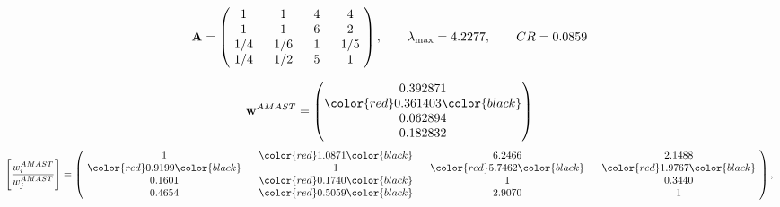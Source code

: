 \begin{example}
\begin{equation*}
\mathbf{A} =
\begin{pmatrix}
$\,\,$ 1 $\,\,$ & $\,\,$1$\,\,$ & $\,\,$4$\,\,$ & $\,\,$4 $\,\,$ \\
$\,\,$ 1 $\,\,$ & $\,\,$ 1 $\,\,$ & $\,\,$6$\,\,$ & $\,\,$2 $\,\,$ \\
$\,\,$ 1/4$\,\,$ & $\,\,$ 1/6$\,\,$ & $\,\,$ 1 $\,\,$ & $\,\,$ 1/5 $\,\,$ \\
$\,\,$ 1/4$\,\,$ & $\,\,$ 1/2$\,\,$ & $\,\,$5$\,\,$ & $\,\,$ 1  $\,\,$ \\
\end{pmatrix},
\qquad
\lambda_{\max} =
4.2277,
\qquad
CR = 0.0859
\end{equation*}

\begin{equation*}
\mathbf{w}^{AMAST} =
\begin{pmatrix}
0.392871\\
\color{red} 0.361403\color{black} \\
0.062894\\
0.182832
\end{pmatrix}\end{equation*}
\begin{equation*}
\left[ \frac{{w}^{AMAST}_i}{{w}^{AMAST}_j} \right] =
\begin{pmatrix}
$\,\,$ 1 $\,\,$ & $\,\,$\color{red} 1.0871\color{black} $\,\,$ & $\,\,$6.2466$\,\,$ & $\,\,$2.1488$\,\,$ \\
$\,\,$\color{red} 0.9199\color{black} $\,\,$ & $\,\,$ 1 $\,\,$ & $\,\,$\color{red} 5.7462\color{black} $\,\,$ & $\,\,$\color{red} 1.9767\color{black}   $\,\,$ \\
$\,\,$0.1601$\,\,$ & $\,\,$\color{red} 0.1740\color{black} $\,\,$ & $\,\,$ 1 $\,\,$ & $\,\,$0.3440 $\,\,$ \\
$\,\,$0.4654$\,\,$ & $\,\,$\color{red} 0.5059\color{black} $\,\,$ & $\,\,$2.9070$\,\,$ & $\,\,$ 1  $\,\,$ \\
\end{pmatrix},
\end{equation*}


\end{example}
